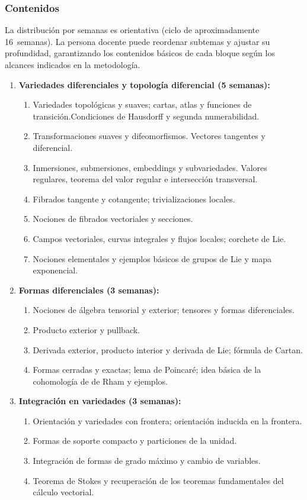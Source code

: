 \begin{refsection}
\subsubsection*{Contenidos}

La distribución por semanas es orientativa (ciclo de aproximadamente 16~semanas). La persona docente puede reordenar subtemas y ajustar su profundidad, garantizando los contenidos básicos de cada bloque según los alcances indicados en la metodología.

\begin{enumerate}
\item \textbf{Variedades diferenciales y topología diferencial (5 semanas):}
\begin{enumerate}
    \item Variedades topológicas y suaves; cartas, atlas y funciones de transición.Condiciones de Hausdorff y segunda numerabilidad.
    \item Transformaciones suaves y difeomorfismos. Vectores tangentes y diferencial.
    \item Inmersiones, submersiones, embeddings y subvariedades. Valores regulares, teorema del valor regular e intersección transversal.
    \item Fibrados tangente y cotangente; trivializaciones locales.
    \item Nociones de fibrados vectoriales y secciones.
    \item Campos vectoriales, curvas integrales y flujos locales; corchete de Lie.
    \item Nociones elementales y ejemplos básicos de grupos de Lie y mapa exponencial.
\end{enumerate}

\item \textbf{Formas diferenciales (3 semanas):}
\begin{enumerate}
    \item Nociones de álgebra tensorial y exterior; tensores y formas diferenciales.
    \item Producto exterior y pullback.
    \item Derivada exterior, producto interior y derivada de Lie; fórmula de Cartan.
    \item Formas cerradas y exactas; lema de Poincaré; idea básica de la cohomología de de Rham y ejemplos.
\end{enumerate}

\item \textbf{Integración en variedades (3 semanas):}
\begin{enumerate}
    \item Orientación y variedades con frontera; orientación inducida en la frontera.
    \item Formas de soporte compacto y particiones de la unidad.
    \item Integración de formas de grado máximo y cambio de variables.
    \item Teorema de Stokes y recuperación de los teoremas fundamentales del cálculo vectorial.
\end{enumerate}


\end{enumerate}
\end{refsection}
